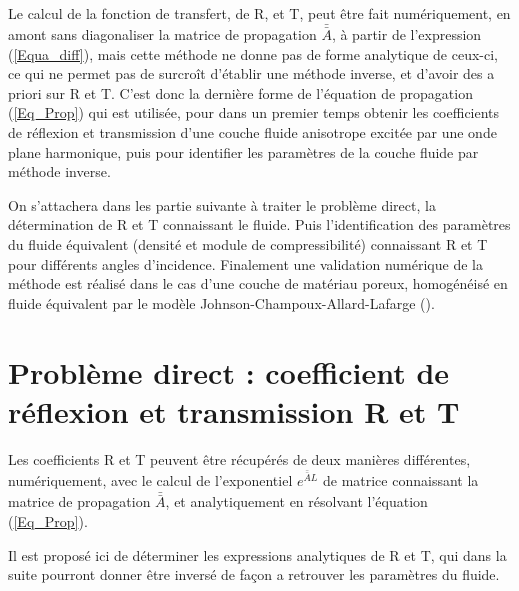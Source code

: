 \documentclass[twoside,openright]{report}
\begin{document}
    Le calcul de la fonction de transfert, de R, et T, peut être fait numériquement, en amont sans diagonaliser la matrice de propagation $\bar{\bar{A}}$, à partir de l'expression (\ref{Equa_diff}), mais cette méthode ne donne pas de forme analytique de ceux-ci, ce qui ne permet pas de surcroît d'établir une méthode inverse, et d'avoir des a priori sur R et T. C'est donc la dernière forme de l'équation de propagation (\ref{Eq_Prop}) qui est utilisée, pour dans un premier temps obtenir les coefficients de réflexion et transmission d'une couche fluide anisotrope excitée par une onde plane harmonique, puis pour identifier les paramètres de la couche fluide par méthode inverse.
    
    On s'attachera dans les partie suivante à traiter le problème direct, la détermination de R et T connaissant le fluide. Puis l'identification des paramètres du fluide équivalent (densité et module de compressibilité) connaissant R et T pour différents angles d'incidence. Finalement une validation numérique de la méthode est réalisé dans le cas d'une couche de matériau poreux, homogénéisé en fluide équivalent par le modèle Johnson-Champoux-Allard-Lafarge (\cite{Johnson}\cite{Lafarge}\cite{Allard}). 
    
\chapter{Problème direct : coefficient de réflexion et transmission R et T}
\label{Ch_Dir}
    Les  coefficients R et T peuvent être récupérés de deux manières différentes, numériquement, avec le calcul de l'exponentiel $e^{\bar{\bar{A}}L}$ de matrice connaissant la matrice de propagation $\bar{\bar{A}}$, et analytiquement en résolvant l'équation (\ref{Eq_Prop}).
    
    Il est proposé ici de déterminer les expressions analytiques de R et T, qui dans la suite  pourront donner être inversé de façon a retrouver les paramètres du fluide. 
\end{document}

